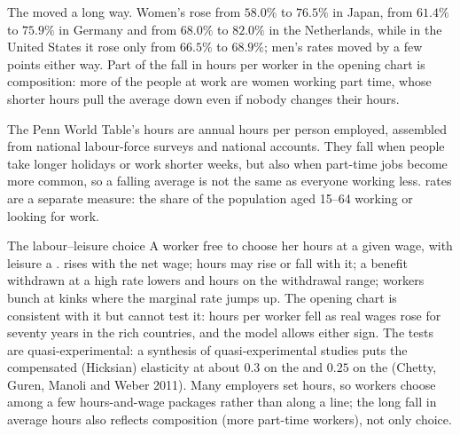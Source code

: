 The  moved a long way. Women's  rose from
$58.0\%$ to $76.5\%$ in Japan, from $61.4\%$ to $75.9\%$ in Germany and from
$68.0\%$ to $82.0\%$ in the Netherlands, while in the United States it rose
only from $66.5\%$ to $68.9\%$; men's rates moved by a few points either
way. %
Part of the fall in hours per worker in the opening chart is composition:
more of the people at work are women working part time, whose shorter hours
pull the average down even if nobody changes their hours.

\begin{measure}
The Penn World Table's hours are annual hours per person employed,
assembled from national labour-force surveys and national accounts. They
fall when people take longer holidays or work shorter weeks, but also
when part-time jobs become more common, so a falling average is not the
same as everyone working less.  rates are a separate
measure: the share of the population aged 15--64 working or looking for
work.
\end{measure}

\begin{model}{The labour--leisure choice}
\assumes A worker free to choose her hours at a given wage, with leisure a
.
\predicts {} rises with the net wage; hours may rise or fall
with it; a benefit withdrawn at a high rate lowers  and hours
on the withdrawal range; workers bunch at kinks where the marginal rate
jumps up.
\tested The opening chart is consistent with it but cannot test it: hours
per worker fell as real wages rose for seventy years in the rich
countries, and the model allows either sign. %
The tests are quasi-experimental: a synthesis of quasi-experimental studies puts the compensated (Hicksian)
elasticity at about $0.3$ on the  and $0.25$ on the  (Chetty, Guren, Manoli and Weber 2011). %
\breaks Many employers set hours, so workers choose among a few
hours-and-wage packages rather than along a line; the long fall in average
hours also reflects composition (more part-time workers), not only choice.
\end{model}

